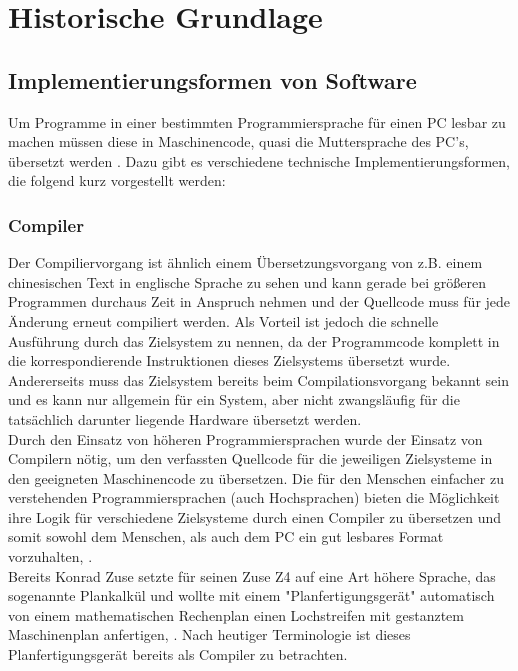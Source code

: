 \chapter{Historische Grundlage} %
\section{Implementierungsformen von Software}
Um Programme in einer bestimmten Programmiersprache für einen \ac{PC} lesbar zu machen müssen diese in Maschinencode, quasi die Muttersprache des \ac{PC}'s, übersetzt werden \cite[vgl. Wagenknecht Hielscher 2022, S.2ff]{wagenknecht_hielscher_2022}. Dazu gibt es verschiedene technische Implementierungsformen, die folgend kurz vorgestellt werden:

\subsection{Compiler}\label{ch_compiler}
Der Compiliervorgang ist ähnlich einem Übersetzungsvorgang von z.B. einem chinesischen Text in englische Sprache zu  sehen und kann gerade bei größeren Programmen durchaus Zeit in Anspruch nehmen und der Quellcode muss für jede Änderung erneut compiliert werden. Als Vorteil ist jedoch die schnelle Ausführung durch das Zielsystem zu nennen, da der Programmcode komplett in die korrespondierende Instruktionen dieses Zielsystems übersetzt wurde. \cite[vgl. Wagenknecht Hielscher, S.121]{wagenknecht_hielscher_2022}
Andererseits muss das Zielsystem bereits beim Compilationsvorgang bekannt sein und es kann nur allgemein für ein System, aber nicht zwangsläufig für die tatsächlich darunter liegende Hardware übersetzt werden. \\
Durch den Einsatz von höheren Programmiersprachen wurde der Einsatz von Compilern nötig, um den verfassten Quellcode für die jeweiligen Zielsysteme in den geeigneten Maschinencode zu übersetzen. Die für den Menschen einfacher zu verstehenden Programmiersprachen (auch Hochsprachen) bieten die Möglichkeit ihre Logik für verschiedene Zielsysteme durch einen Compiler zu übersetzen und somit sowohl dem Menschen, als auch dem \ac{PC} ein gut lesbares Format vorzuhalten, \cite[vgl. Wagenknecht Hielscher, S.1ff]{wagenknecht_hielscher_2022}.\\
Bereits Konrad Zuse setzte für seinen Zuse Z4 auf eine Art höhere Sprache, das sogenannte Plankalkül und wollte mit einem "Planfertigungsgerät" automatisch von einem mathematischen Rechenplan einen Lochstreifen mit gestanztem Maschinenplan anfertigen, \cite[vgl. Heilige 2013, S.45]{Hellige2013}. Nach heutiger Terminologie ist dieses Planfertigungsgerät bereits als Compiler zu betrachten. \\
